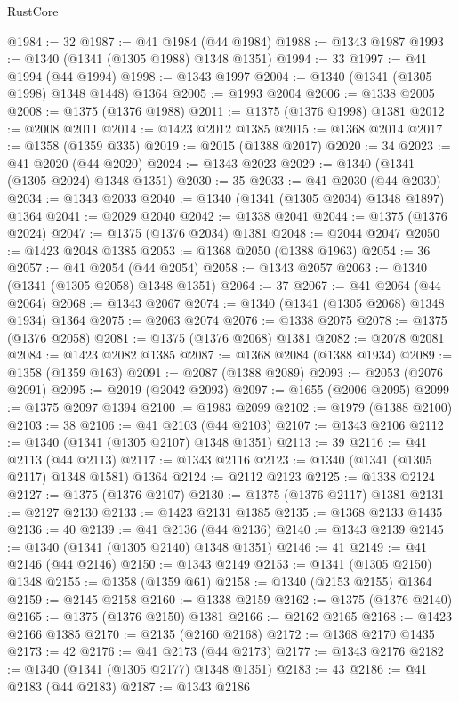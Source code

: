 \begin{lexlean}{RustCore}
\begin{coremodule}
@1984 := 32
@1987 := @41 @1984 (@44 @1984)
@1988 := @1343 @1987
@1993 := @1340 (@1341 (@1305 @1988) @1348 @1351)
@1994 := 33
@1997 := @41 @1994 (@44 @1994)
@1998 := @1343 @1997
@2004 := @1340 (@1341 (@1305 @1998) @1348 @1448) @1364
@2005 := @1993 @2004
@2006 := @1338 @2005
@2008 := @1375 (@1376 @1988)
@2011 := @1375 (@1376 @1998) @1381
@2012 := @2008 @2011
@2014 := @1423 @2012 @1385
@2015 := @1368 @2014
@2017 := @1358 (@1359 @335)
@2019 := @2015 (@1388 @2017)
@2020 := 34
@2023 := @41 @2020 (@44 @2020)
@2024 := @1343 @2023
@2029 := @1340 (@1341 (@1305 @2024) @1348 @1351)
@2030 := 35
@2033 := @41 @2030 (@44 @2030)
@2034 := @1343 @2033
@2040 := @1340 (@1341 (@1305 @2034) @1348 @1897) @1364
@2041 := @2029 @2040
@2042 := @1338 @2041
@2044 := @1375 (@1376 @2024)
@2047 := @1375 (@1376 @2034) @1381
@2048 := @2044 @2047
@2050 := @1423 @2048 @1385
@2053 := @1368 @2050 (@1388 @1963)
@2054 := 36
@2057 := @41 @2054 (@44 @2054)
@2058 := @1343 @2057
@2063 := @1340 (@1341 (@1305 @2058) @1348 @1351)
@2064 := 37
@2067 := @41 @2064 (@44 @2064)
@2068 := @1343 @2067
@2074 := @1340 (@1341 (@1305 @2068) @1348 @1934) @1364
@2075 := @2063 @2074
@2076 := @1338 @2075
@2078 := @1375 (@1376 @2058)
@2081 := @1375 (@1376 @2068) @1381
@2082 := @2078 @2081
@2084 := @1423 @2082 @1385
@2087 := @1368 @2084 (@1388 @1934)
@2089 := @1358 (@1359 @163)
@2091 := @2087 (@1388 @2089)
@2093 := @2053 (@2076 @2091)
@2095 := @2019 (@2042 @2093)
@2097 := @1655 (@2006 @2095)
@2099 := @1375 @2097 @1394
@2100 := @1983 @2099
@2102 := @1979 (@1388 @2100)
@2103 := 38
@2106 := @41 @2103 (@44 @2103)
@2107 := @1343 @2106
@2112 := @1340 (@1341 (@1305 @2107) @1348 @1351)
@2113 := 39
@2116 := @41 @2113 (@44 @2113)
@2117 := @1343 @2116
@2123 := @1340 (@1341 (@1305 @2117) @1348 @1581) @1364
@2124 := @2112 @2123
@2125 := @1338 @2124
@2127 := @1375 (@1376 @2107)
@2130 := @1375 (@1376 @2117) @1381
@2131 := @2127 @2130
@2133 := @1423 @2131 @1385
@2135 := @1368 @2133 @1435
@2136 := 40
@2139 := @41 @2136 (@44 @2136)
@2140 := @1343 @2139
@2145 := @1340 (@1341 (@1305 @2140) @1348 @1351)
@2146 := 41
@2149 := @41 @2146 (@44 @2146)
@2150 := @1343 @2149
@2153 := @1341 (@1305 @2150) @1348
@2155 := @1358 (@1359 @61)
@2158 := @1340 (@2153 @2155) @1364
@2159 := @2145 @2158
@2160 := @1338 @2159
@2162 := @1375 (@1376 @2140)
@2165 := @1375 (@1376 @2150) @1381
@2166 := @2162 @2165
@2168 := @1423 @2166 @1385
@2170 := @2135 (@2160 @2168)
@2172 := @1368 @2170 @1435
@2173 := 42
@2176 := @41 @2173 (@44 @2173)
@2177 := @1343 @2176
@2182 := @1340 (@1341 (@1305 @2177) @1348 @1351)
@2183 := 43
@2186 := @41 @2183 (@44 @2183)
@2187 := @1343 @2186

\end{coremodule}
\end{lexlean}
